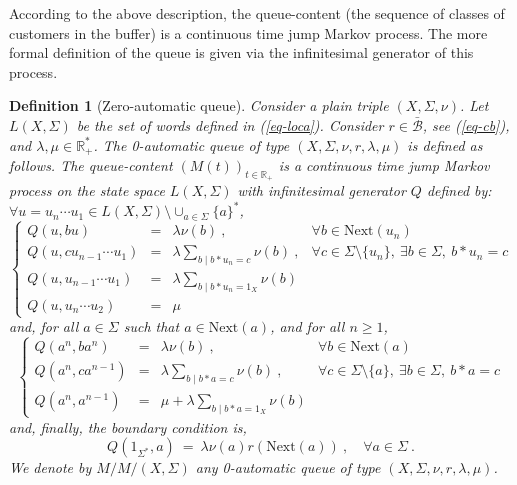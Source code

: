 \documentclass[11pt,a4paper]{article}
\newtheorem{definition}[theorem]{Definition}
\theoremstyle{remark}
\def\Blackboardfont{\mathbb}
\def\rig{\text{Next}}
\def\lef{\text{Next}}
\def\closcb{\bar{\cB}}
\def\R{{\Blackboardfont R}}
\def\cB{{\mathcal B}}
\def\eref#1{(\ref{#1})}
\begin{document}
\medskip

According to the above description, the queue-content (the
sequence of classes of customers in the buffer) is a continuous
time jump Markov process. The more formal definition of the queue
is given via the infinitesimal generator of this process.

\begin{definition}[Zero-automatic queue]\label{de-0aut}
Consider a plain triple $(X,\Sigma,\nu)$.
Let $L(X,\Sigma)$ be the
set of words defined in \eref{eq-loca}. Consider
$r \in \closcb$, see \eref{eq-cb},  and $\lambda, \mu \in \R_+^*$.
The {\em 0-automatic queue} of type $(X,\Sigma,\nu,r,\lambda,\mu)$
is defined as follows. The {\em
  queue-content} $(M(t))_{t\in \R_+}$ is a continuous time
jump Markov process on the state space $L(X,\Sigma)$ with infinitesimal generator
$Q$ defined by: $\forall u=u_n\cdots u_1 \in L(X,\Sigma) \setminus \cup_{a\in
  \Sigma}\{a\}^*$,
\begin{equation}\label{eq-main}
\left\{ \begin{array}{lcll}
Q(u,bu) & = & \lambda\nu(b)\ ,  & \forall b \in \lef(u_n)\\
Q(u,cu_{n-1}\cdots u_1) & = & \lambda \sum_{b \mid b\ast u_n=c}
\nu(b) \ ,&
\forall c \in \Sigma\setminus\{u_n\}, \ \exists b \in \Sigma, \ b\ast u_n=c \\
Q(u,u_{n-1}\cdots u_1)  & = & \lambda \sum_{b\mid b\ast u_n=1_X} \nu(b) & \\
Q(u,u_{n}\cdots u_2 )  & = & \mu &
\end{array} \right.
\end{equation}
and, for all $a\in \Sigma$ such that $a \in \rig(a)$, and for all
$n\geq 1$,
\begin{equation}\label{eq-main2}
\left\{ \begin{array}{lcll}
Q(a^n,ba^n) & = & \lambda\nu(b)\ ,  & \forall b \in \lef(a)\\
Q(a^n,ca^{n-1}) & = &  \lambda \sum_{b \mid b\ast a=c} \nu(b) \ ,&
\forall c \in \Sigma\setminus\{a\}, \ \exists b \in \Sigma, \ b\ast a=c \\
Q(a^n,a^{n-1})  & = & \mu + \lambda \sum_{b\mid b\ast a=1_X}
\nu(b)
\end{array} \right.
\end{equation}
and, finally, the boundary condition is,
\begin{equation}\label{eq-bound}
Q(1_{\Sigma^*}, a) \ = \ \lambda \nu(a) r(\rig(a))\ , \quad
\forall a \in \Sigma\:.
\end{equation}
We denote by $M/M/(X,\Sigma)$ any 0-automatic queue of type
$(X,\Sigma,\nu,r,\lambda,\mu)$.
\end{definition}
\end{document}
